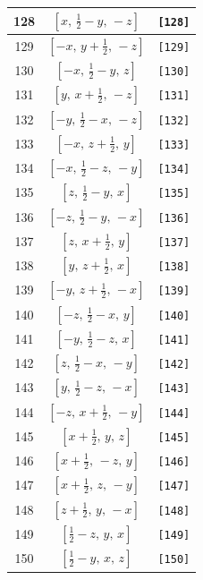 \documentclass[fleqn,8pt]{jsarticle}
\begin{document}
\begin{longtable}{ccc}
128 & $\left[ x,\, \frac{1}{2} - y,\, - z \right]$ & {\tt [128]} \\ \hline
129 & $\left[ - x,\, y + \frac{1}{2},\, - z \right]$ & {\tt [129]} \\ \hline
130 & $\left[ - x,\, \frac{1}{2} - y,\, z \right]$ & {\tt [130]} \\ \hline
131 & $\left[ y,\, x + \frac{1}{2},\, - z \right]$ & {\tt [131]} \\ \hline
132 & $\left[ - y,\, \frac{1}{2} - x,\, - z \right]$ & {\tt [132]} \\ \hline
133 & $\left[ - x,\, z + \frac{1}{2},\, y \right]$ & {\tt [133]} \\ \hline
134 & $\left[ - x,\, \frac{1}{2} - z,\, - y \right]$ & {\tt [134]} \\ \hline
135 & $\left[ z,\, \frac{1}{2} - y,\, x \right]$ & {\tt [135]} \\ \hline
136 & $\left[ - z,\, \frac{1}{2} - y,\, - x \right]$ & {\tt [136]} \\ \hline
137 & $\left[ z,\, x + \frac{1}{2},\, y \right]$ & {\tt [137]} \\ \hline
138 & $\left[ y,\, z + \frac{1}{2},\, x \right]$ & {\tt [138]} \\ \hline
139 & $\left[ - y,\, z + \frac{1}{2},\, - x \right]$ & {\tt [139]} \\ \hline
140 & $\left[ - z,\, \frac{1}{2} - x,\, y \right]$ & {\tt [140]} \\ \hline
141 & $\left[ - y,\, \frac{1}{2} - z,\, x \right]$ & {\tt [141]} \\ \hline
142 & $\left[ z,\, \frac{1}{2} - x,\, - y \right]$ & {\tt [142]} \\ \hline
143 & $\left[ y,\, \frac{1}{2} - z,\, - x \right]$ & {\tt [143]} \\ \hline
144 & $\left[ - z,\, x + \frac{1}{2},\, - y \right]$ & {\tt [144]} \\ \hline
145 & $\left[ x + \frac{1}{2},\, y,\, z \right]$ & {\tt [145]} \\ \hline
146 & $\left[ x + \frac{1}{2},\, - z,\, y \right]$ & {\tt [146]} \\ \hline
147 & $\left[ x + \frac{1}{2},\, z,\, - y \right]$ & {\tt [147]} \\ \hline
148 & $\left[ z + \frac{1}{2},\, y,\, - x \right]$ & {\tt [148]} \\ \hline
149 & $\left[ \frac{1}{2} - z,\, y,\, x \right]$ & {\tt [149]} \\ \hline
150 & $\left[ \frac{1}{2} - y,\, x,\, z \right]$ & {\tt [150]} \\ \hline

\end{longtable}
\end{document}

